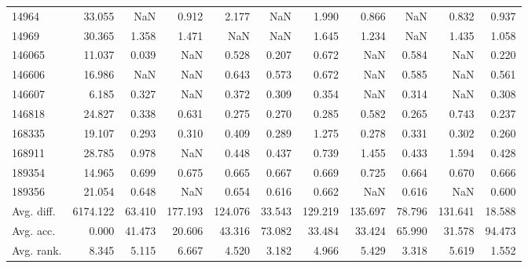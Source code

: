 \begin{tabular}{lrrrrrrrrrr}
14964 & 33.055 & NaN & 0.912 & 2.177 & NaN & 1.990 & 0.866 & NaN & 0.832 & 0.937 \\
14969 & 30.365 & 1.358 & 1.471 & NaN & NaN & 1.645 & 1.234 & NaN & 1.435 & 1.058 \\
146065 & 11.037 & 0.039 & NaN & 0.528 & 0.207 & 0.672 & NaN & 0.584 & NaN & 0.220 \\
146606 & 16.986 & NaN & NaN & 0.643 & 0.573 & 0.672 & NaN & 0.585 & NaN & 0.561 \\
146607 & 6.185 & 0.327 & NaN & 0.372 & 0.309 & 0.354 & NaN & 0.314 & NaN & 0.308 \\
146818 & 24.827 & 0.338 & 0.631 & 0.275 & 0.270 & 0.285 & 0.582 & 0.265 & 0.743 & 0.237 \\
168335 & 19.107 & 0.293 & 0.310 & 0.409 & 0.289 & 1.275 & 0.278 & 0.331 & 0.302 & 0.260 \\
168911 & 28.785 & 0.978 & NaN & 0.448 & 0.437 & 0.739 & 1.455 & 0.433 & 1.594 & 0.428 \\
189354 & 14.965 & 0.699 & 0.675 & 0.665 & 0.667 & 0.669 & 0.725 & 0.664 & 0.670 & 0.666 \\
189356 & 21.054 & 0.648 & NaN & 0.654 & 0.616 & 0.662 & NaN & 0.616 & NaN & 0.600 \\
Avg. diff. & 6174.122 & 63.410 & 177.193 & 124.076 & 33.543 & 129.219 & 135.697 & 78.796 & 131.641 & 18.588 \\
Avg. acc. & 0.000 & 41.473 & 20.606 & 43.316 & 73.082 & 33.484 & 33.424 & 65.990 & 31.578 & 94.473 \\
Avg. rank. & 8.345 & 5.115 & 6.667 & 4.520 & 3.182 & 4.966 & 5.429 & 3.318 & 5.619 & 1.552 \\
\bottomrule
\end{tabular}
